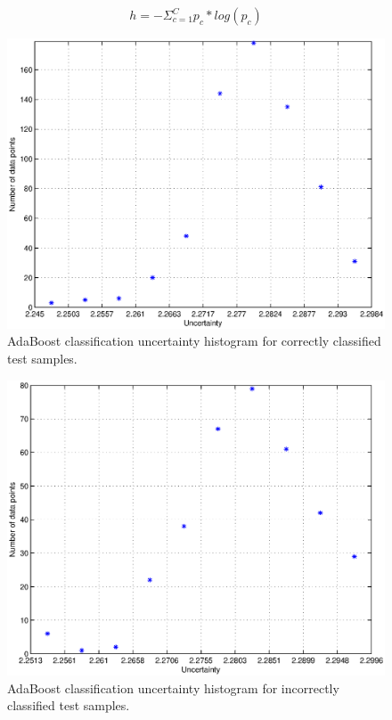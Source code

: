 \documentclass[journal, a4paper]{IEEEtran}
\begin{document}
    \begin{equation}
      h = -\Sigma_{c=1}^C p_c * log(p_c)
    \end{equation}
    
    
     \begin{figure}[ht]
      \centering
      \includegraphics[width=.8\linewidth]{ada_correct}
      \caption{AdaBoost classification uncertainty histogram for correctly classified test samples.}
      \label{fig:boost_true}
    \end{figure}

    \begin{figure}[ht]
      \centering
      \includegraphics[width=.8\linewidth]{ada_incorrect}
      \caption{AdaBoost classification uncertainty histogram for incorrectly classified test samples.}
      \label{fig:boost_false}
    \end{figure}
    

    
   
\end{document}
